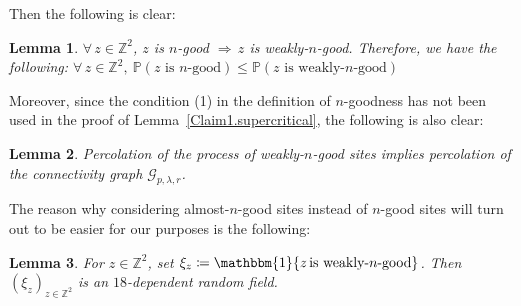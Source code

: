 \documentclass[10pt,a4paper]{amsart}
\theoremstyle{exampstyle}
\newtheorem{Lemma}{Lemma}
\theoremstyle{exampnotations}
\begin{document}
Then the following is clear:
\begin{Lemma}
\label{Lemma1.almost}
$\forall \, z \in \mathbb{Z}^{2}$, $z$ is $n$-good $\Rightarrow \, z$ is weakly-$n$-good. Therefore, we have the following: $\forall \, z \in \mathbb{Z}^{2}, \: \mathbb{P}(\text{$z$ is $n$-good}) \leq \mathbb{P}(\text{$z$ is weakly-$n$-good})$
\end{Lemma} Moreover, since the condition (1) in the definition of $n$-goodness has not been used in the proof of Lemma~\ref{Claim1.supercritical}, the following is also clear:
\begin{Lemma}
\label{Lemma2.almost}
Percolation of the process of weakly-$n$-good sites implies percolation of the connectivity graph $\mathcal{G}_{p,\lambda,r}$.
\end{Lemma}
The reason why considering almost-$n$-good sites instead of $n$-good sites will turn out to be easier for our purposes is the following:
\begin{Lemma}
\label{Claim2.supercritical}
For $z \in \mathbb{Z}^{2}$, set $\xi_{z} \coloneqq \mathbbm{1}\lbrace z \, \text{is weakly-$n$-good} \rbrace$. Then $(\xi_{z})_{z \in \mathbb{Z}^{2}}$ is an $18$-dependent random field.
\end{Lemma}
\end{document}

